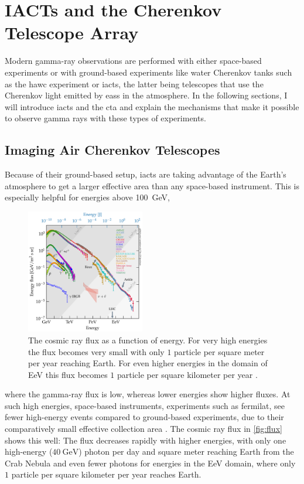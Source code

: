 \chapter{IACTs and the Cherenkov Telescope Array}

Modern gamma-ray observations are performed with either space-based experiments or with
ground-based experiments like water Cherenkov tanks such as the \gls{hawc} \cite{hawc} experiment or \glspl{iact}, the latter
being telescopes that use the Cherenkov light emitted by \glspl{eas} in the atmosphere.
In the following sections, I will introduce \glspl{iact} and the \gls{cta} and explain the mechanisms
that make it possible to observe gamma rays with these types of experiments.


\section{Imaging Air Cherenkov Telescopes}
\label{sec:iact}

Because of their ground-based setup, \glspl{iact} are taking advantage of the Earth's atmosphere to get a
larger effective area than any space-based instrument. This is especially helpful for energies above
\SI{100}{\giga\eV},
\begin{figure}
    \centering
    \vspace*{-0.5cm}
    \includegraphics[width=0.46\textwidth]{graphics/cr_spectrum.pdf}
    \caption{The cosmic ray flux as a function of energy. For very high energies the flux becomes very
    small with only \(\num{1}\) particle per square meter per year reaching Earth. For even higher
    energies in the domain of \si{\exa\eV} this flux becomes \(\num{1}\) particle per square
    kilometer per year \cite{carmelo_2020}.}
    \label{fig:flux}
\end{figure}
where the gamma-ray flux is low, whereas lower energies show higher fluxes. At such high energies,
space-based instruments, experiments such as \gls{fermilat}, see fewer high-energy events compared
to ground-based experiments, due to their comparatively small effective collection area \cite[p.~256]{funk}.
The cosmic ray flux in \autoref{fig:flux} shows this well: The flux decreases rapidly with higher
energies, with only one high-energy (\greater\(\SI{40}{\giga\eV}\)) photon per day and square meter
reaching Earth from the Crab Nebula \cite{noethe_thesis} and even fewer photons for energies in the
\si{\exa\eV} domain, where only \(\num{1}\) particle per square kilometer per year reaches Earth.

